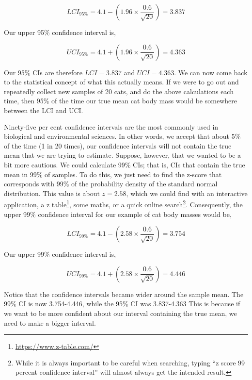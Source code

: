 \documentclass[
  openany]{krantz}
\renewcommand{\href}[2]{#2\footnote{\url{#1}}}
\begin{document}
\[LCI_{95\%} = 4.1 - \left(1.96 \times \frac{0.6}{\sqrt{20}}\right) = 3.837\]

Our upper 95\% confidence interval is,

\[UCI_{95\%} = 4.1 + \left(1.96 \times \frac{0.6}{\sqrt{20}}\right) = 4.363\]

Our 95\% CIs are therefore \(LCI = 3.837\) and \(UCI = 4.363\).
We can now come back to the statistical concept of what this actually means.
If we were to go out and repeatedly collect new samples of 20 cats, and do the above calculations each time, then 95\% of the time our true mean cat body mass would be somewhere between the LCI and UCI.

Ninety-five per cent confidence intervals are the most commonly used in biological and environmental sciences.
In other words, we accept that about 5\% of the time (1 in 20 times), our confidence intervals will not contain the true mean that we are trying to estimate.
Suppose, however, that we wanted to be a bit more cautious.
We could calculate 99\% CIs; that is, CIs that contain the true mean in 99\% of samples.
To do this, we just need to find the z-score that corresponds with 99\% of the probability density of the standard normal distribution.
This value is about \(z = 2.58\), which we could find with an interactive application, a \href{https://www.z-table.com/}{z table}, some maths, or a quick online search\footnote{While it is always important to be careful when searching, typing ``z score 99 percent confidence interval'' will almost always get the intended result.}.
Consequently, the upper 99\% confidence interval for our example of cat body masses would be,

\[LCI_{99\%} = 4.1 - \left(2.58 \times \frac{0.6}{\sqrt{20}}\right) = 3.754\]

Our upper 99\% confidence interval is,

\[UCI_{99\%} = 4.1 + \left(2.58 \times \frac{0.6}{\sqrt{20}}\right) = 4.446\]

Notice that the confidence intervals became wider around the sample mean.
The 99\% CI is now 3.754-4.446, while the 95\% CI was 3.837-4.363
This is because if we want to be more confident about our interval containing the true mean, we need to make a bigger interval.
\end{document}
